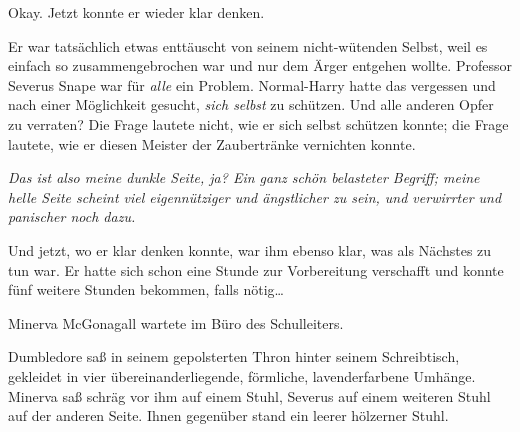 Okay. Jetzt konnte er wieder klar denken.

Er war tatsächlich etwas enttäuscht von seinem nicht-wütenden Selbst, weil es einfach so zusammengebrochen war und nur dem Ärger entgehen wollte. Professor Severus Snape war für \emph{alle} ein Problem. Normal-Harry hatte das vergessen und nach einer Möglichkeit gesucht, \emph{sich selbst} zu schützen. Und alle anderen Opfer zu verraten? Die Frage lautete nicht, wie er sich selbst schützen konnte; die Frage lautete, wie er diesen Meister der Zaubertränke vernichten konnte.

\emph{Das ist also meine dunkle Seite, ja? Ein ganz schön belasteter Begriff; meine helle Seite scheint viel eigennütziger und ängstlicher zu sein, und verwirrter und panischer noch dazu.}

Und jetzt, wo er klar denken konnte, war ihm ebenso klar, was als Nächstes zu tun war. Er hatte sich schon eine Stunde zur Vorbereitung verschafft und konnte fünf weitere Stunden bekommen, falls nötig…

\later

Minerva McGonagall wartete im Büro des Schulleiters.

Dumbledore saß in seinem gepolsterten Thron hinter seinem Schreibtisch, gekleidet in vier übereinanderliegende, förmliche, lavenderfarbene Umhänge. Minerva saß schräg vor ihm auf einem Stuhl, Severus auf einem weiteren Stuhl auf der anderen Seite. Ihnen gegenüber stand ein leerer hölzerner Stuhl.

